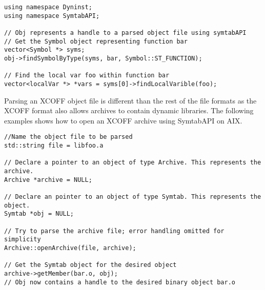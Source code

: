 \begin{lstlisting}
using namespace Dyninst;
using namespace SymtabAPI;

// Obj represents a handle to a parsed object file using symtabAPI
// Get the Symbol object representing function bar
vector<Symbol *> syms;
obj->findSymbolByType(syms, bar, Symbol::ST_FUNCTION);

// Find the local var foo within function bar
vector<localVar *> *vars = syms[0]->findLocalVarible(foo);
\end{lstlisting}

Parsing an XCOFF object file is different than the rest of the file formats as the XCOFF format also allows archives to contain dynamic libraries. The following examples shows how to open an XCOFF archive using SymtabAPI on AIX.

\begin{lstlisting}
//Name the object file to be parsed
std::string file = libfoo.a

// Declare a pointer to an object of type Archive. This represents the archive.
Archive *archive = NULL;

// Declare an pointer to an object of type Symtab. This represents the object.
Symtab *obj = NULL;

// Try to parse the archive file; error handling omitted for simplicity
Archive::openArchive(file, archive);

// Get the Symtab object for the desired object
archive->getMember(bar.o, obj);
// Obj now contains a handle to the desired binary object bar.o
\end{lstlisting}

